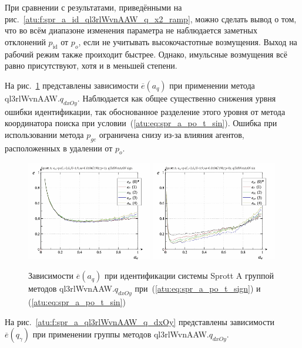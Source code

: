 При сравнении с результатами, приведёнными на рис.~\ref{atu:f:spr_a_id_ql3rlWvnAAW_q_x2_ramp},
можно сделать вывод о том, что во всём диапазоне изменения параметра
не наблюдается заметных отклонений $p_\mathrm{id}$ от $p_o$,
если не учитывать высокочастотные возмущения. Выход на рабочий режим также проиходит быстрее.
Однако, имульсные возмущения всё равно присутствуют,
хотя и в меньшей степени.

На рис.~\ref{atu:f:spr_a_a_q_ql3rlWvnAAW_q_dxOy} представлены зависимости
$\overline{e}(a_q)$ при применении метода ql3rlWvnAAW.$q_{dxOy}$.
Наблюдается как общее существенно снижения урвня ошибки идентификации,
так обоснованное разделение этого уровня от метода
координатора поиска при условии~(\ref{atu:eq:spr_a_po_t_sin}).
Ошибка при использовании метода $p_{gc}$ ограничена снизу
из-за влияния агентов, расположенных в удалении от $p_o$.

\begin{figure}[htb!]
  \centerline{
    \includegraphics[width=0.49\textwidth]{p/cha/spr_a/ql3rlWvnAAW_dxOy/sprott_a_id2-p_a_q_sign.png}
    \hfill
    \includegraphics[width=0.49\textwidth]{p/cha/spr_a/ql3rlWvnAAW_dxOy/sprott_a_id2-p_a_q_sin.png}
  }
  \caption{Зависимости $\overline{e}(a_q)$ при идентификации системы Sprott A группой методов ql3rlWvnAAW.$q_{dxOy}$
   при~(\ref{atu:eq:spr_a_po_t_sign}) и (\ref{atu:eq:spr_a_po_t_sin})}
  \label{atu:f:spr_a_a_q_ql3rlWvnAAW_q_dxOy}
\end{figure}

На рис.~\ref{atu:f:spr_a_ql3rlWvnAAW_q_dxOy} представлены зависимости
$\overline{e}(q_\gamma)$ при применении группы методов ql3rlWvnAAW.$q_{dxOy}$.

